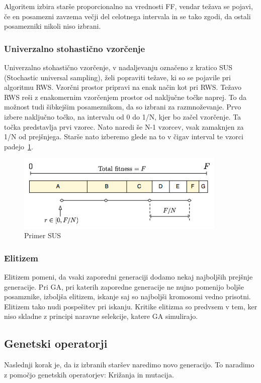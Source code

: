 \documentclass[a4paper, 12pt]{book}
\begin{document}
Algoritem izbira starše proporcionalno na vrednosti FF, vendar težava se pojavi, če en posamezni zavzema večji del celotnega intervala in se tako zgodi, da ostali posamezniki nikoli niso izbrani.
\subsubsection{Univerzalno stohastično vzorčenje}
Univerzalno stohastično vzorčenje, v nadaljevanju označeno z kratico SUS (Stochastic universal sampling), želi popraviti težave, ki so se pojavile pri algoritmu RWS. Vzorčni prostor pripravi na enak način kot pri RWS. Težavo RWS reši z enakomernim vzorčenjem prostor od naključne točke naprej. To da možnost tudi šibkejšim posameznikom, da so izbrani za razmnoževanje. Prvo izbere naključno točko, na intervalu od 0 do 1/N, kjer bo začel vzorčenje. Ta točka predstavlja prvi vzorec. Nato naredi še N-1 vzorcev, vsak zamaknjen za 1/N od prejšnjega. Starše nato izberemo glede na to v čigav interval te vzorci padejo~\ref{picSUS}.
\begin{figure}[H]
\begin{center}
\includegraphics[width=10cm]{Statistically_Uniform.png}
\end{center}
\caption{Primer SUS}
\label{picSUS}
\end{figure}

\subsubsection{Elitizem}
Elitizem pomeni, da vsaki zaporedni generaciji dodamo nekaj najboljših prejšnje generacije. Pri GA, pri katerih zaporedne generacije ne nujno pomenijo boljše posamznike, izboljša elitizem, iskanje saj so najboljši kromosomi vedno prisotni. Elitizem tako nudi pospešitev pri iskanju. Kritike elitizma so predvsem v tem, ker niso skladne z principi naravne selekcije, katere GA simulirajo.

\subsection{Genetski operatorji}
Naslednji korak je, da iz izbranih staršev naredimo novo generacijo. To naradimo z pomočjo genetskih operatorjev: Križanja in mutacija.
\end{document}
